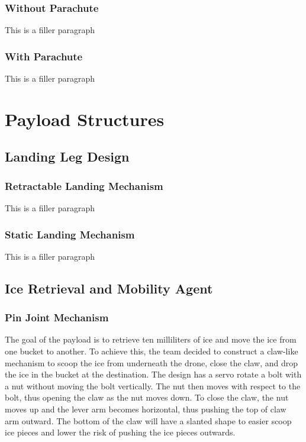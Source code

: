 		\subsubsection{Without Parachute}
			This is a filler paragraph
		
		\subsubsection{With Parachute}
			This is a filler paragraph

\section{Payload Structures}\label{PL:Tradeoffs:Structures}
	\subsection{Landing Leg Design}
		\subsubsection{Retractable Landing Mechanism}
			This is a filler paragraph

		\subsubsection{Static Landing Mechanism}
			This is a filler paragraph

	\subsection{Ice Retrieval and Mobility Agent}
		\subsubsection{Pin Joint Mechanism}
			The goal of the payload is to retrieve ten milliliters of ice and move the ice from one bucket to another. To achieve this, the team decided to construct a claw-like mechanism to scoop the ice from underneath the drone, close the claw, and drop the ice in the bucket at the destination. The design has a servo rotate a bolt with a nut without moving the bolt vertically. The nut then moves with respect to the bolt, thus opening the claw as the nut moves down. To close the claw, the nut moves up and the lever arm becomes horizontal, thus pushing the top of claw arm outward. The bottom of the claw will have a slanted shape to easier scoop ice pieces and lower the risk of pushing the ice pieces outwards. 

